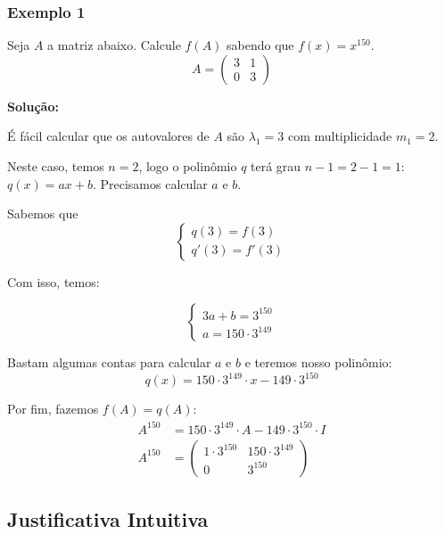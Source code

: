 \documentclass[12pt]{article}
\begin{document}
	\subsubsection{Exemplo 1}
	
	Seja $A$ a matriz abaixo. Calcule $f(A)$ sabendo que $f(x)=x^{150}$.
	\begin{equation*}
		A=\begin{pmatrix}
			3 & 1 \\
			0 & 3
		\end{pmatrix}
	\end{equation*}
	
	\textbf{Solução:}
	
	É fácil calcular que os autovalores de $A$ são $\lambda_1=3$ com multiplicidade $m_1=2$.
	
	Neste caso, temos $n=2$, logo o polinômio $q$ terá grau $n-1=2-1=1$: $q(x)=ax+b$. Precisamos calcular $a$ e $b$.
	
	Sabemos que 
	\begin{equation*}
		\begin{cases}
			q(3)=f(3)\\q'(3)=f'(3)
		\end{cases}
	\end{equation*}
	
	Com isso, temos:
	
	\begin{equation*}
		\begin{cases}
			3a+b=3^{150}\\a=150\cdot 3^{149}
		\end{cases}
	\end{equation*}
	
	Bastam algumas contas para calcular $a$ e $b$ e teremos nosso polinômio:
	\begin{equation*}
		q(x)=150\cdot 3^{149}\cdot x-149\cdot 3^{150}
	\end{equation*}
	
	Por fim, fazemos $f(A)=q(A)$:
	\begin{align*}
		A^{150}&=150\cdot 3^{149}\cdot A-149\cdot 3^{150}\cdot I\\
		A^{150}&=\begin{pmatrix}
			1\cdot 3^{150}&150\cdot 3^{149}  \\
			0& 3^{150}
		\end{pmatrix}	
	\end{align*}
	
	\subsection{Justificativa Intuitiva}
	
\end{document}
